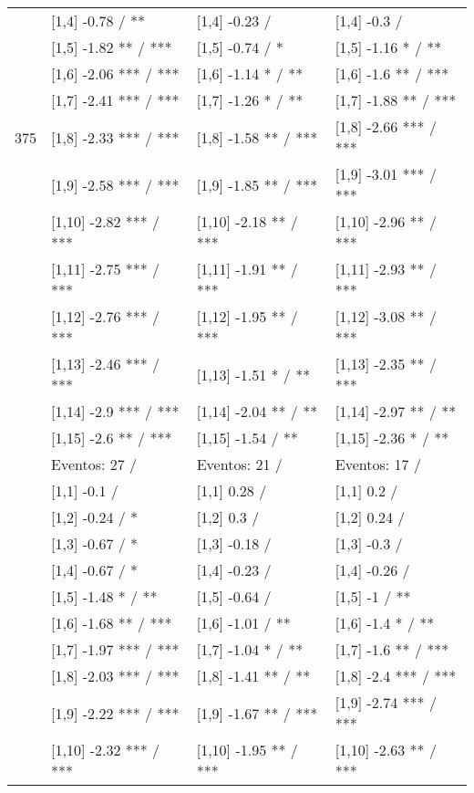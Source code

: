 \begin{table}
\begin{tabular}[t]{llll}
\addlinespace
 & {}[1,4] -0.78  / ** & {}[1,4] -0.23  / & {}[1,4] -0.3  /\\
 & {}[1,5] -1.82 ** / *** & {}[1,5] -0.74  / * & {}[1,5] -1.16 * / **\\
 & {}[1,6] -2.06 *** / *** & {}[1,6] -1.14 * / ** & {}[1,6] -1.6 ** / ***\\
 & {}[1,7] -2.41 *** / *** & {}[1,7] -1.26 * / ** & {}[1,7] -1.88 ** / ***\\
375 & {}[1,8] -2.33 *** / *** & {}[1,8] -1.58 ** / *** & {}[1,8] -2.66 *** / ***\\
\addlinespace
 & {}[1,9] -2.58 *** / *** & {}[1,9] -1.85 ** / *** & {}[1,9] -3.01 *** / ***\\
 & {}[1,10] -2.82 *** / *** & {}[1,10] -2.18 ** / *** & {}[1,10] -2.96 ** / ***\\
 & {}[1,11] -2.75 *** / *** & {}[1,11] -1.91 ** / *** & {}[1,11] -2.93 ** / ***\\
 & {}[1,12] -2.76 *** / *** & {}[1,12] -1.95 ** / *** & {}[1,12] -3.08 ** / ***\\
 & {}[1,13] -2.46 *** / *** & {}[1,13] -1.51 * / ** & {}[1,13] -2.35 ** / ***\\
\addlinespace
 & {}[1,14] -2.9 *** / *** & {}[1,14] -2.04 ** / ** & {}[1,14] -2.97 ** / **\\
 & {}[1,15] -2.6 ** / *** & {}[1,15] -1.54  / ** & {}[1,15] -2.36 * / **\\
 & Eventos:  27 / & Eventos:  21 / & Eventos:  17 /\\
 & {}[1,1] -0.1  / & {}[1,1] 0.28  / & {}[1,1] 0.2  /\\
 & {}[1,2] -0.24  / * & {}[1,2] 0.3  / & {}[1,2] 0.24  /\\
\addlinespace
 & {}[1,3] -0.67  / * & {}[1,3] -0.18  / & {}[1,3] -0.3  /\\
 & {}[1,4] -0.67  / * & {}[1,4] -0.23  / & {}[1,4] -0.26  /\\
 & {}[1,5] -1.48 * / ** & {}[1,5] -0.64  / & {}[1,5] -1  / **\\
 & {}[1,6] -1.68 ** / *** & {}[1,6] -1.01  / ** & {}[1,6] -1.4 * / **\\
 & {}[1,7] -1.97 *** / *** & {}[1,7] -1.04 * / ** & {}[1,7] -1.6 ** / ***\\
\addlinespace
500 & {}[1,8] -2.03 *** / *** & {}[1,8] -1.41 ** / ** & {}[1,8] -2.4 *** / ***\\
 & {}[1,9] -2.22 *** / *** & {}[1,9] -1.67 ** / *** & {}[1,9] -2.74 *** / ***\\
 & {}[1,10] -2.32 *** / *** & {}[1,10] -1.95 ** / *** & {}[1,10] -2.63 ** / ***\\

\end{tabular}
\end{table}
